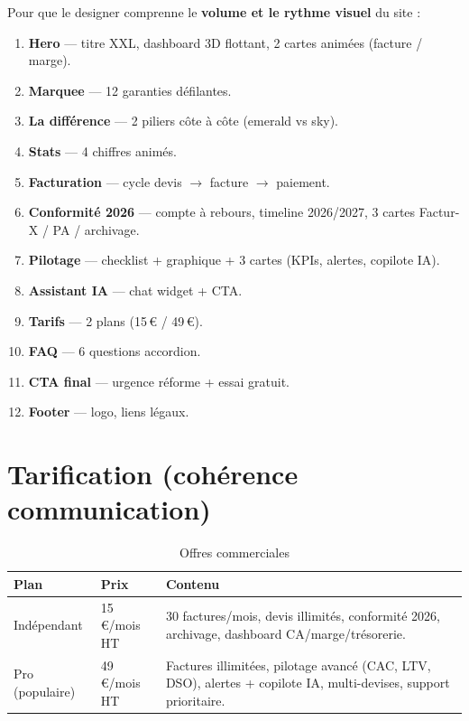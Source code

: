 \documentclass[11pt,a4paper]{report}
\begin{document}
Pour que le designer comprenne le \textbf{volume et le rythme visuel} du site :

\begin{enumerate}[leftmargin=*]
    \item \textbf{Hero} — titre XXL, dashboard 3D flottant, 2 cartes animées (facture / marge).
    \item \textbf{Marquee} — 12 garanties défilantes.
    \item \textbf{La différence} — 2 piliers côte à côte (emerald vs sky).
    \item \textbf{Stats} — 4 chiffres animés.
    \item \textbf{Facturation} — cycle devis $\rightarrow$ facture $\rightarrow$ paiement.
    \item \textbf{Conformité 2026} — compte à rebours, timeline 2026/2027, 3 cartes Factur-X / PA / archivage.
    \item \textbf{Pilotage} — checklist + graphique + 3 cartes (KPIs, alertes, copilote IA).
    \item \textbf{Assistant IA} — chat widget + CTA.
    \item \textbf{Tarifs} — 2 plans (15\,€ / 49\,€).
    \item \textbf{FAQ} — 6 questions accordion.
    \item \textbf{CTA final} — urgence réforme + essai gratuit.
    \item \textbf{Footer} — logo, liens légaux.
\end{enumerate}

\chapter{Tarification (cohérence communication)}

\begin{table}[h]
\centering
\caption{Offres commerciales}
\begin{tabular}{@{}llp{7.5cm}@{}}
\toprule
\textbf{Plan} & \textbf{Prix} & \textbf{Contenu} \\
\midrule
Indépendant & 15\,€/mois HT & 30 factures/mois, devis illimités, conformité 2026, archivage, dashboard CA/marge/trésorerie. \\
Pro (populaire) & 49\,€/mois HT & Factures illimitées, pilotage avancé (CAC, LTV, DSO), alertes + copilote IA, multi-devises, support prioritaire. \\
\bottomrule
\end{tabular}
\end{table}
\end{document}
